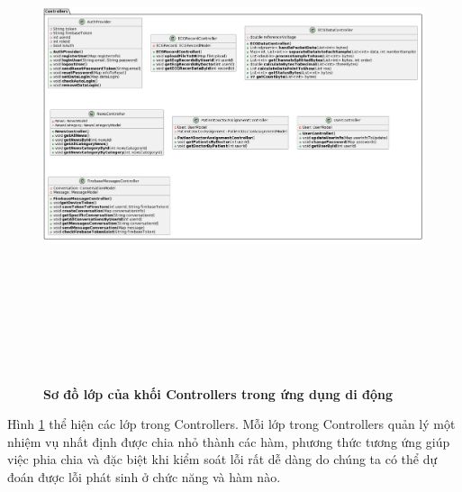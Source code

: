 \begin{enumerate}[a)]
  \begin{figure}[H]
    \centering
    \includegraphics[width=16cm,height=15cm]{Images/mobile_app/class_diagram/mobile_class_controller.png}
    \caption[Sơ đồ lớp của khối Controllers trong ứng dụng di động]{\bfseries \fontsize{12pt}{0pt}\selectfont Sơ đồ lớp của khối Controllers trong ứng dụng di động}
    \label{mobile_class_controller} %
  \end{figure}

  Hình \ref{mobile_class_controller} thể hiện các lớp trong Controllers. Mỗi lớp trong Controllers quản lý một nhiệm vụ
  nhất định được chia nhỏ thành các hàm, phương thức tương ứng giúp việc phia chia và đặc biệt khi kiểm soát lỗi rất dễ dàng do
  chúng ta có thể dự đoán được lỗi phát sinh ở chức năng và hàm nào. 


\end{enumerate}
